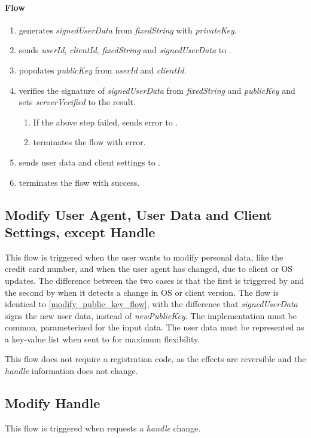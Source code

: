 \documentclass[a4paper,10pt,draft]{article}
\newcommand{\signedUserData}{\emph{signedUserData}}
\newcommand{\newPublicKey}{\emph{newPublicKey}}
\newcommand{\serverVerified}{\emph{serverVerified}}
\newcommand{\handle}{\emph{handle}}
\newcommand{\privateKey}{\emph{privateKey}}
\newcommand{\publicKey}{\emph{publicKey}}
\newcommand{\userId}{\emph{userId}}
\newcommand{\clientId}{\emph{clientId}}
\newcommand{\fixedString}{\emph{fixedString}}
\begin{document}
\paragraph{Flow}

\begin{enumerate}
 \item \Client{} generates \signedUserData{} from \fixedString{} with 
\privateKey{}.
 \item \Client{} sends \userId{}, \clientId{}, \fixedString{} and 
\signedUserData{} to \Server{}.
 \item \Server{} populates \publicKey{} from \userId{} and \clientId{}.
 \item \Server{} verifies the signature of \signedUserData{} from 
\fixedString{} and \publicKey{} and sets \serverVerified{} to the result.
 \begin{enumerate}
  \item If the above step failed, \Server{} sends error to \Client{}.
  \item \Client{} terminates the flow with error.
 \end{enumerate}
 \item \Server{} sends user data and client settings to \Client{}.
 \item \Client{} terminates the flow with success.
\end{enumerate}

\subsection{Modify User Agent, User Data and Client Settings, except Handle}
\label{modify_user_data_flow}
This flow is triggered when the user wants to modify personal data, like the 
credit card number, and when the user agent has changed, due to client or OS 
updates. The difference between the two cases is that the first is triggered by 
\User{} and the second by \Client{} when it detects a change in OS or 
client version. The flow is identical to \ref{modify_public_key_flow}, with the 
difference that \signedUserData{} signs the new user data, instead of 
\newPublicKey{}. The implementation must be common, parameterized for the input 
data. The user data must be represented as a key-value list when sent to 
\Server{} for maximum flexibility.

This flow does not require a registration code, as the effects are reversible 
and the \handle{} information does not change.

\subsection{Modify Handle}
This flow is triggered when \User{} requests a \handle{} change.
\end{document}
